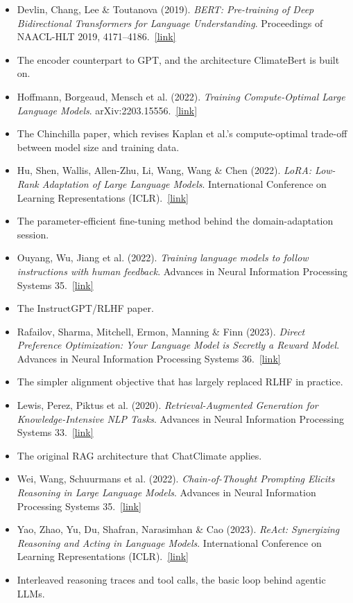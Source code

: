 \documentclass[11pt]{article}
\newcommand{\reading}[5]{%
  \item #1. \textit{#2}. #3.\ \href{#4}{[link]}%
}
\begin{document}
\begin{itemize}
  \reading{Devlin, Chang, Lee \& Toutanova (2019)}{BERT: Pre-training of Deep Bidirectional Transformers for Language Understanding}{Proceedings of NAACL-HLT 2019, 4171--4186}{https://arxiv.org/abs/1810.04805}{}
  \item[] {\small\color{notegray}The encoder counterpart to GPT, and the architecture ClimateBert is built on.}
  \reading{Hoffmann, Borgeaud, Mensch et al. (2022)}{Training Compute-Optimal Large Language Models}{arXiv:2203.15556}{https://arxiv.org/abs/2203.15556}{}
  \item[] {\small\color{notegray}The Chinchilla paper, which revises Kaplan et al.'s compute-optimal trade-off between model size and training data.}
  \reading{Hu, Shen, Wallis, Allen-Zhu, Li, Wang, Wang \& Chen (2022)}{LoRA: Low-Rank Adaptation of Large Language Models}{International Conference on Learning Representations (ICLR)}{https://arxiv.org/abs/2106.09685}{}
  \item[] {\small\color{notegray}The parameter-efficient fine-tuning method behind the domain-adaptation session.}
  \reading{Ouyang, Wu, Jiang et al. (2022)}{Training language models to follow instructions with human feedback}{Advances in Neural Information Processing Systems 35}{https://arxiv.org/abs/2203.02155}{}
  \item[] {\small\color{notegray}The InstructGPT/RLHF paper.}
  \reading{Rafailov, Sharma, Mitchell, Ermon, Manning \& Finn (2023)}{Direct Preference Optimization: Your Language Model is Secretly a Reward Model}{Advances in Neural Information Processing Systems 36}{https://arxiv.org/abs/2305.18290}{}
  \item[] {\small\color{notegray}The simpler alignment objective that has largely replaced RLHF in practice.}
  \reading{Lewis, Perez, Piktus et al. (2020)}{Retrieval-Augmented Generation for Knowledge-Intensive NLP Tasks}{Advances in Neural Information Processing Systems 33}{https://arxiv.org/abs/2005.11401}{}
  \item[] {\small\color{notegray}The original RAG architecture that ChatClimate applies.}
  \reading{Wei, Wang, Schuurmans et al. (2022)}{Chain-of-Thought Prompting Elicits Reasoning in Large Language Models}{Advances in Neural Information Processing Systems 35}{https://arxiv.org/abs/2201.11903}{}
  \reading{Yao, Zhao, Yu, Du, Shafran, Narasimhan \& Cao (2023)}{ReAct: Synergizing Reasoning and Acting in Language Models}{International Conference on Learning Representations (ICLR)}{https://arxiv.org/abs/2210.03629}{}
  \item[] {\small\color{notegray}Interleaved reasoning traces and tool calls, the basic loop behind agentic LLMs.}

\end{itemize}
\end{document}
